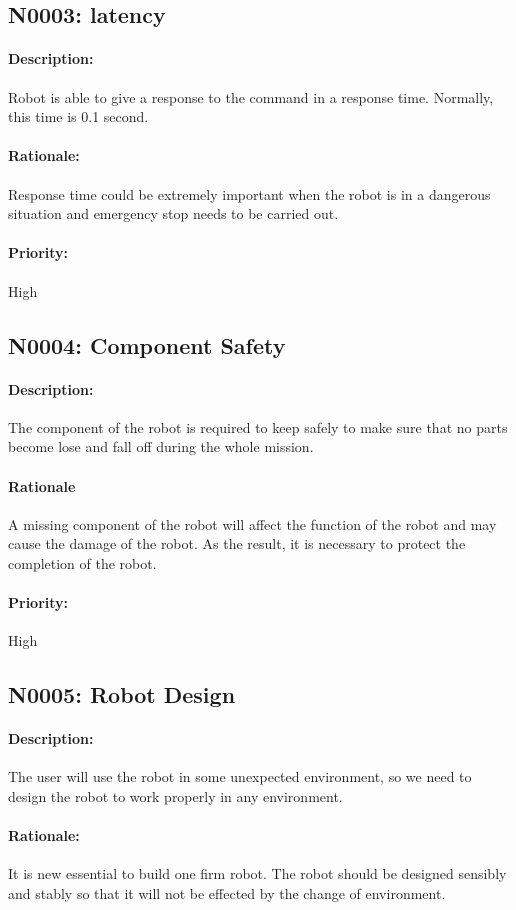 \documentclass[11pt, a4paper]{report}
\begin{document}
\subsection{N0003: latency}
\paragraph{Description:}
Robot is able to give a response to the command in a response time. Normally, this time is 0.1 second.
\paragraph{Rationale:}
Response time could be extremely important when the robot is in a dangerous situation and emergency stop needs to be carried out.
\paragraph{Priority:}
High

\subsection{N0004: Component Safety}
\paragraph{Description:}
The component of the robot is required to keep safely to make sure that no parts become lose and fall off during the whole mission. 
\paragraph{Rationale}    
A missing component of the robot will affect the function of the robot and may cause the damage of the robot. As the result, it is necessary to protect the completion of the robot.
\paragraph{Priority:}
High
\subsection{N0005: Robot Design}
\paragraph{Description:}
The user will use the robot in some unexpected environment, so we need to design the robot to work properly in any environment. 
\paragraph{Rationale:}
It is new essential to build one firm robot. The robot should be designed sensibly and stably so that it will not be effected by the change of environment. 
\end{document}
